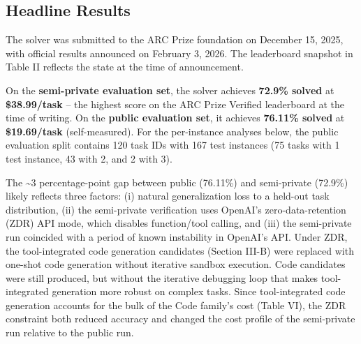 \documentclass[conference]{IEEEtran}
\begin{document}
\subsection{Headline Results}\label{headline-results}

The solver was submitted to the ARC Prize foundation on December 15,
2025, with official results announced on February 3, 2026. The
leaderboard snapshot in Table II reflects the state at the time of
announcement.

On the \textbf{semi-private evaluation set}, the solver achieves
\textbf{72.9\% solved} at \textbf{\$38.99/task} -- the highest score on
the ARC Prize Verified leaderboard at the time of writing. On the
\textbf{public evaluation set}, it achieves \textbf{76.11\% solved} at
\textbf{\$19.69/task} (self-measured). For the per-instance analyses
below, the public evaluation split contains 120 task IDs with 167 test
instances (75 tasks with 1 test instance, 43 with 2, and 2 with 3).

The \textasciitilde3 percentage-point gap between public (76.11\%) and
semi-private (72.9\%) likely reflects three factors: (i) natural
generalization loss to a held-out task distribution, (ii) the
semi-private verification uses OpenAI's zero-data-retention (ZDR) API
mode, which disables function/tool calling, and (iii) the semi-private
run coincided with a period of known instability in OpenAI's API. Under
ZDR, the tool-integrated code generation candidates (Section III-B) were
replaced with one-shot code generation without iterative sandbox
execution. Code candidates were still produced, but without the
iterative debugging loop that makes tool-integrated generation more
robust on complex tasks. Since tool-integrated code generation accounts
for the bulk of the Code family's cost (Table VI), the ZDR constraint
both reduced accuracy and changed the cost profile of the semi-private
run relative to the public run.
\end{document}
